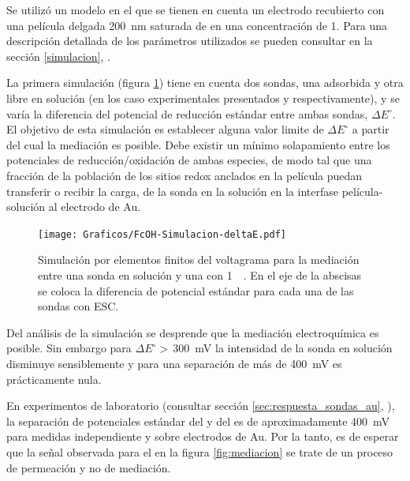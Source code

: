		Se utilizó un modelo en el que se tienen en cuenta un electrodo recubierto con una película delgada \SI{200}{nm} saturada de  \aminorutenio en una concentración de \SI{1}{\Molar}. Para una descripción detallada de los parámetros utilizados se pueden consultar en la sección \ref{simulacion}, \pageref{simulacion}. 

		La primera simulación (figura \ref{fig:sim_mediacion}) tiene en cuenta dos sondas, una adsorbida y otra libre en solución (en los caso experimentales presentados \ru\space y \fc\space respectivamente), y se varía la diferencia del potencial de reducción estándar entre ambas sondas, $\Delta E^\circ$. El objetivo de esta simulación es establecer alguna valor limite de $\Delta E^\circ$ a partir del cual la mediación es posible. Debe existir un mínimo solapamiento entre los potenciales de reducción/oxidación de ambas especies, de modo tal que una fracción de la población de los sitios redox anclados en la película puedan transferir o recibir la carga, de la sonda en la solución en la interfase película-solución al electrodo de Au.

			\begin{figure}[ht]
					\centering
			 	    \texttt{[image: Graficos/FcOH-Simulacion-deltaE.pdf]}
			        \vspace*{-2mm}
			        \caption[Simulación EQ de mediación redox]{Simulación por elementos finitos del voltagrama para la mediación entre una sonda en solución y una \pdmF\space con \ru\space \SI{1}{\milli\Molar}. En el eje de la abscisas se coloca la diferencia de potencial estándar para cada una de las sondas con ESC.}
			        \label{fig:sim_mediacion}
			      	\end{figure}

		Del análisis de la simulación se desprende que la mediación electroquímica es posible. Sin embargo para $\Delta E^\circ\!\!>\,$\SI{300}{\milli\volt} la intensidad de la sonda en solución disminuye sensiblemente y para una separación de más de \SI{400}{\milli\volt} es prácticamente nula. 

		En experimentos de laboratorio (consultar sección \ref{sec:respuesta_sondas_au}, \pageref{sec:respuesta_sondas_au}), la separación de potenciales estándar del \ru\space y del \fc\space es de aproximadamente \SI{400}{\milli\volt} para medidas independiente y sobre electrodos de Au. Por la tanto, es de esperar que la señal observada para el \fc\space en la figura \ref{fig:mediacion} se trate de un proceso de permeación y no de mediación.

